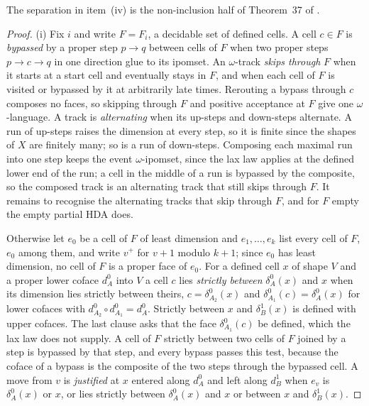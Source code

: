 \documentclass{lmcs}
\theoremstyle{definition}
\theoremstyle{remark}
\begin{document}
The separation in item~(iv) is the non-inclusion half of
Theorem~37 of \cite{PAF25}.

\begin{proof}
(i) Fix $i$ and write $F=F_i$, a decidable set of defined cells. A cell $c\in F$ is \emph{bypassed} by a proper
step $p\to q$ between cells of $F$ when two proper steps $p\to c\to q$ in one direction glue to its
ipomset. An $\omega$-track \emph{skips through} $F$ when it starts at a start cell and eventually stays in $F$, and when
each cell of $F$ is visited or bypassed by it at arbitrarily late times. Rerouting a bypass through $c$ composes no
faces, so skipping through $F$ and positive acceptance at $F$ give one
$\omega$-language. A track is
\emph{alternating} when its up-steps and down-steps alternate. A run of up-steps raises the dimension at every
step, so it is finite since the shapes of $X$ are finitely many; so is a run of down-steps. Composing each maximal
run into one step keeps the event $\omega$-ipomset, since the lax law applies at the defined lower end of the run; a cell in the middle of
a run is bypassed by the composite, so the composed track is an alternating track that still skips through
$F$.
It remains to recognise the alternating tracks that skip through $F$, and for $F$ empty the empty partial HDA does.

Otherwise let $e_0$ be a cell of $F$ of least dimension and $e_1,\dots,e_k$ list every cell of $F$, $e_0$ among
them, and write $v^+$ for $v+1$
modulo $k+1$; since $e_0$ has least dimension, no cell of $F$ is a proper face of $e_0$.
For a defined cell $x$ of shape $V$ and a proper lower coface $d^0_A$ into $V$ a cell $c$ lies \emph{strictly
between} $\delta^0_A(x)$ and $x$ when its dimension lies strictly between theirs, $c=\delta^0_{A_2}(x)$ and
$\delta^0_{A_1}(c)=\delta^0_A(x)$ for lower cofaces with $d^0_{A_2}\circ d^0_{A_1}=d^0_A$. Strictly between $x$ and
$\delta^1_B(x)$ is defined with upper cofaces. The last
clause asks that the face $\delta^0_{A_1}(c)$ be defined, which the lax law does not supply. A
cell of $F$ strictly between two cells of $F$ joined by a step is bypassed by that step, and every bypass passes
this test, because the coface of a bypass is the composite of the two steps through the bypassed
cell.
A move from $v$ is \emph{justified} at $x$ entered along $d^0_A$ and left along $d^1_B$ when $e_v$ is
$\delta^0_A(x)$ or $x$, or lies strictly between $\delta^0_A(x)$ and $x$ or between $x$ and
$\delta^1_B(x)$.


\end{proof}
\end{document}
